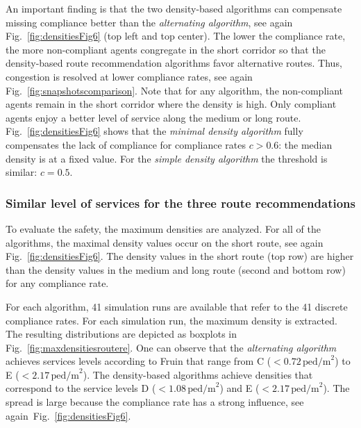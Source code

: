 An important finding is that the two density-based algorithms can compensate missing compliance better than the \textit{alternating algorithm}, see again Fig.~\ref{fig:densitiesFig6} (top left and top center). 
The lower the compliance rate, the more non-compliant agents congregate in the short corridor
so that the density-based route recommendation algorithms favor alternative routes. Thus, congestion is resolved at lower compliance rates, see again Fig.~\ref{fig:snapshotscomparison}. Note that for any algorithm, the non-compliant agents remain in the short corridor where the density is high. Only compliant agents enjoy a better level of service along the medium or long route.
Fig.~\ref{fig:densitiesFig6} shows that the \textit{minimal density algorithm} fully compensates the lack of compliance for compliance rates $c>0.6$: the median density is at a fixed value. For the \textit{simple density algorithm} the threshold is similar: $c=0.5$.









\subsubsection{Similar level of services for the three route recommendations}


To evaluate the safety, the maximum densities are analyzed. For all of the algorithms, the maximal density values occur on the short route, see again Fig.~\ref{fig:densitiesFig6}. The density values in the short route (top row) are higher than the density values in the medium and long route (second and bottom row) for any compliance rate.

For each algorithm, 41 simulation runs are available that refer to the 41 discrete compliance rates. For each simulation run, the maximum density is extracted. The resulting distributions are depicted as boxplots in Fig.~\ref{fig:maxdensitiesroutere}. One can observe that the \textit{alternating algorithm} achieves services levels according to Fruin that range from C ($<0.72\,\text{ped/m}^2$) to E ($<2.17\,\text{ped/m}^2$). The density-based algorithms achieve densities that correspond to the service levels D ($<1.08\,\text{ped/m}^2$) and E ($<2.17\,\text{ped/m}^2$).
The spread is large because the compliance rate has a strong influence, see again~Fig.~\ref{fig:densitiesFig6}.




